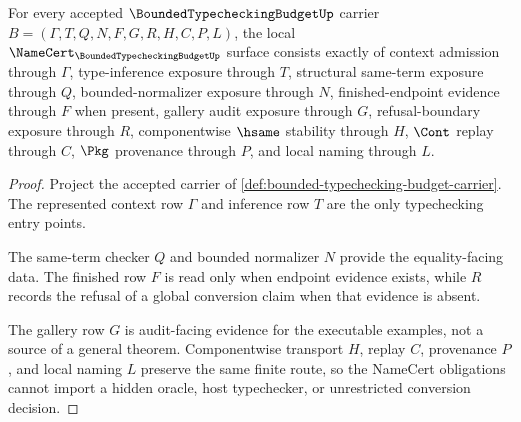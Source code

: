 \begin{theorem}
\label{thm:bounded-typechecking-budget-namecert-obligations}
For every accepted $\BoundedTypecheckingBudgetUp$ carrier $B=(\Gamma,T,Q,N,F,G,R,H,C,P,L)$, the local $\NameCert_{\BoundedTypecheckingBudgetUp}$ surface consists exactly of context admission through $\Gamma$, type-inference exposure through $T$, structural same-term exposure through $Q$, bounded-normalizer exposure through $N$, finished-endpoint evidence through $F$ when present, gallery audit exposure through $G$, refusal-boundary exposure through $R$, componentwise $\hsame$ stability through $H$, $\Cont$ replay through $C$, $\Pkg$ provenance through $P$, and local naming through $L$.
\end{theorem}
\begin{proof}
Project the accepted carrier of \autoref{def:bounded-typechecking-budget-carrier}. The represented context row $\Gamma$ and inference row $T$ are the only typechecking entry points.

The same-term checker $Q$ and bounded normalizer $N$ provide the equality-facing data. The finished row $F$ is read only when endpoint evidence exists, while $R$ records the refusal of a global conversion claim when that evidence is absent.

The gallery row $G$ is audit-facing evidence for the executable examples, not a source of a general theorem. Componentwise transport $H$, replay $C$, provenance $P$, and local naming $L$ preserve the same finite route, so the NameCert obligations cannot import a hidden oracle, host typechecker, or unrestricted conversion decision.
\end{proof}

